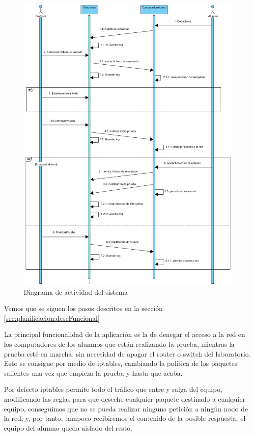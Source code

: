 \begin{figure}
    \centering
    \includegraphics[width=12cm]{arquitectura/actividadSistema}
    \caption{Diagrama de actividad del sistema}
    \label{fig:arquitectura:actividadSistema}
\end{figure}


Vemos que se siguen los pasos descritos en la sección \ref{sec:planificacion:descFuncional}


La principal funcionalidad de la aplicación es la de denegar el acceso a la red en los computadores de los alumnos que están realizando la prueba, mientras la prueba esté en marcha, sin necesidad de apagar el router o switch del laboratorio. Esto se consigue por medio de iptables, cambiando la política de los paquetes salientes una vez que empieza la prueba y hasta que acaba.
\newline

Por defecto iptables permite todo el tráfico que entre y salga del equipo, modificando las reglas para que deseche cualquier paquete destinado a cualquier equipo, conseguimos que no se pueda realizar ninguna petición a ningún nodo de la red, y, por tanto, tampoco recibiremos el contenido de la posible respuesta, el equipo del alumno queda aislado del resto.
\newline

